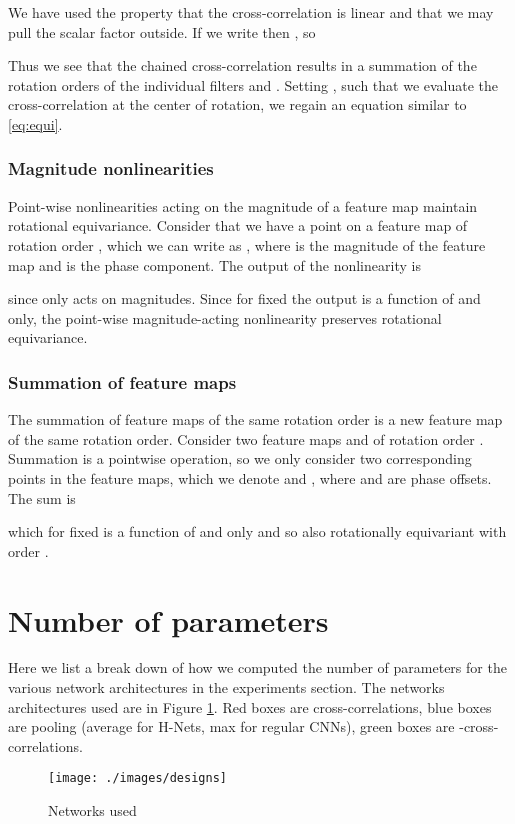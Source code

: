 \documentclass[10pt,twocolumn,letterpaper]{article}
\begin{document}
We have used the property that the cross-correlation is linear and that we may pull the scalar factor  outside. If we write  then , so

Thus we see that the chained cross-correlation results in a summation of the rotation orders of the individual filters  and . Setting , such that we evaluate the cross-correlation at the center of rotation, we regain an equation similar to \ref{eq:equi}.

\subsubsection{Magnitude nonlinearities}
Point-wise nonlinearities acting on the magnitude of a feature map maintain rotational 
equivariance. Consider that we have a point on a feature map of rotation order , which 
we can write as , where  is the magnitude of the feature map and 
 is the phase component. The output of the nonlinearity  
is

since  only acts on magnitudes. Since for fixed  the output is a function of 
and  only, the point-wise magnitude-acting nonlinearity preserves rotational
equivariance.

\subsubsection{Summation of feature maps}
The summation of feature maps of the same rotation order is a new feature map of the
same rotation order. Consider two feature maps  and  of rotation
order . Summation is a pointwise operation, so we only consider two corresponding 
points in the feature maps, which we denote  and 
, where  and  are phase offsets. The
sum is

which for fixed  is a function of  and  only 
and so also rotationally equivariant with order .

\newpage
\section{Number of parameters}
Here we list a break down of how we computed the number of parameters for the 
various network architectures in the experiments section. The networks architectures
used are in Figure \ref{fig:networks}. Red boxes are cross-correlations, blue
boxes are pooling (average for H-Nets, max for regular CNNs), green boxes are 
-cross-correlations.
\begin{figure}[h!]
	\centering
	\texttt{[image: ./images/designs]}
    \caption{Networks used}
    \label{fig:networks}
\end{figure}
\end{document}
